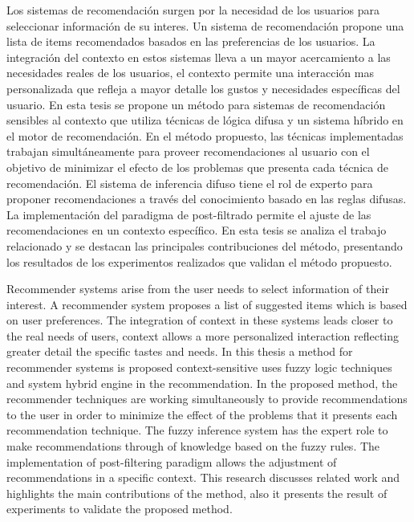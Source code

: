 
Los sistemas de recomendaci\'on surgen por la necesidad 
de los usuarios para seleccionar informaci\'on de su interes. 
Un sistema de recomendaci\'on propone una lista de items 
recomendados basados en las preferencias de los usuarios. 
La integraci\'on del contexto en estos sistemas lleva a 
un mayor acercamiento a las necesidades reales de los 
usuarios, el contexto permite una interacci\'on mas 
personalizada que refleja a mayor detalle los gustos y 
necesidades espec\'ificas del usuario. En esta tesis se 
propone un m\'etodo para sistemas de recomendaci\'on 
sensibles al contexto que utiliza t\'ecnicas de l\'ogica 
difusa y un sistema h\'ibrido en el motor de recomendaci\'on. 
En el m\'etodo propuesto, las t\'ecnicas implementadas 
trabajan simult\'aneamente para proveer recomendaciones 
al usuario con el objetivo de minimizar el efecto de 
los problemas que presenta cada t\'ecnica de 
recomendaci\'on. El sistema de inferencia difuso 
tiene el rol de experto para proponer recomendaciones 
a trav\'es del conocimiento basado en las reglas difusas. 
La implementaci\'on del paradigma de post-filtrado 
permite el ajuste de las recomendaciones en un 
contexto espec\'ifico. En esta tesis se analiza el 
trabajo relacionado y se destacan las principales 
contribuciones del m\'etodo, presentando los resultados 
de los experimentos realizados que validan el 
m\'etodo propuesto.


Recommender systems arise from the user needs
to select information of their interest. A recommender system
proposes a list of suggested items which is based on
user preferences. The integration of context in these
systems leads closer to the real needs of
users, context allows a more personalized interaction
reflecting greater detail the specific tastes and needs.
In this thesis a method for recommender systems is 
proposed context-sensitive uses fuzzy logic techniques 
and system hybrid engine in the recommendation. 
In the proposed method, the recommender techniques 
are working simultaneously to provide recommendations 
to the user in order to minimize the effect of the 
problems that it presents each recommendation technique. 
The fuzzy inference system has the expert role to 
make recommendations through of knowledge based on 
the fuzzy rules. The implementation of post-filtering 
paradigm allows the adjustment of recommendations in a 
specific context. This research discusses related work 
and highlights the main contributions of the method, 
also it presents the result of experiments 
to validate the proposed method.












